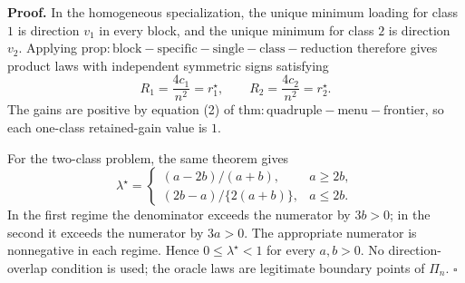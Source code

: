 \textbf{Proof.}
In the homogeneous specialization, the unique minimum loading for class \(1\) is direction \(v_1\) in every block, and the unique minimum for class \(2\) is direction \(v_2\). Applying \(\mathrm{prop:block-specific-single-class-reduction}\) therefore gives product laws with independent symmetric signs satisfying
\[
R_1=\frac{4c_1}{n^2}=r_1^\star,
\qquad
R_2=\frac{4c_2}{n^2}=r_2^\star.
\tag{1}
\]
The gains are positive by equation (2) of \(\mathrm{thm:quadruple-menu-frontier}\), so each one-class retained-gain value is \(1\).

For the two-class problem, the same theorem gives
\[
\lambda^\star=
\begin{cases}
(a-2b)/(a+b),&a\ge2b,\\[4pt]
(2b-a)/\{2(a+b)\},&a\le2b.
\end{cases}
\]
In the first regime the denominator exceeds the numerator by \(3b>0\); in the second it exceeds the numerator by \(3a>0\). The appropriate numerator is nonnegative in each regime. Hence \(0\le\lambda^\star<1\) for every \(a,b>0\). No direction-overlap condition is used; the oracle laws are legitimate boundary points of \(\Pi_n\). \(\square\)